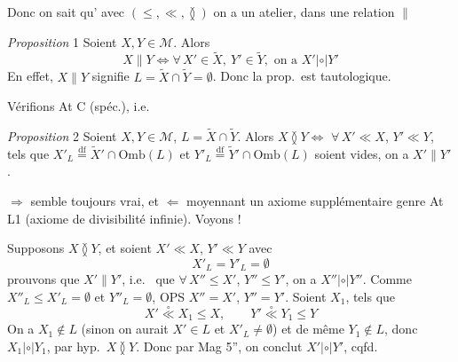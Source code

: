 \documentclass[11pt,a4paper]{article}
\begin{document}
Donc on sait qu'\struck{\ill{}} avec $(\leq, \ll, \between)$ on a un atelier,  dans  \ill{} une relation $\parallel$

\emph{Proposition} 1 Soient $X, Y \in \mathcal{M}$. Alors
\[
  X \parallel Y \Longleftrightarrow \forall\, X' \in \widetilde{X},\ Y' \in \widetilde{Y}, \text{ on a } X' \mathrel{|{\circ}|} Y'
\]
En effet, $X \parallel Y$ signifie   $L = \widetilde{X} \cap \widetilde{Y} = \emptyset$.  Donc la prop.\ est tautologique.

Vérifions At C (spéc.), i.e.

\emph{Proposition} 2  Soient $X, Y \in \mathcal{M}$, $L = \widetilde{X} \cap \widetilde{Y}$.  Alors $X \between Y \Longleftrightarrow$  $\forall\, X' \ll X$, $Y' \ll Y$, tels que $X'_L \overset{\mathrm{df}}{=} \widetilde{X}' \cap \mathrm{Omb}(L)$ et $Y'_L \overset{\mathrm{df}}{=} \widetilde{Y}' \cap \mathrm{Omb}(L)$ soient vides, on a $X' \parallel Y'$.

$\Longrightarrow$ semble toujours vrai, et $\Longleftarrow$ moyennant un axiome \struck{\ill{}} supplémentaire genre At L1 (axiome de divisibilité infinie). Voyons !

Supposons $X \between Y$, et soient $X' \ll X$, $Y' \ll Y$ avec
\[
  X'_L = Y'_L = \emptyset
\]
prouvons que $X' \parallel Y'$, i.e.\  que  $\forall\, X'' \leq X'$, $Y'' \leq Y'$, on a $X'' \mathrel{|{\circ}|} Y''$. Comme  $X''_L \leq X'_L = \emptyset$ et \struck{\ill{}} $Y''_L = \emptyset$, OPS $X'' = X'$, $Y'' = Y'$. Soient $X_1$,  tels que 
\[
  X' \mathrel{\overset{\circ}{\ll}} X_1 \leq X, \qquad Y' \mathrel{\overset{\circ}{\ll}} Y_1 \leq Y
\]
On a $X_1 \notin L$ (sinon on aurait $X' \in L$ et $X'_L \neq \emptyset$) et de même $Y_1 \notin L$, donc $X_1 \mathrel{|{\circ}|} Y_1$, par hyp.\ $X \between Y$. Donc par Mag 5'', on conclut $X' \mathrel{|{\circ}|} Y'$, cqfd.
\end{document}
